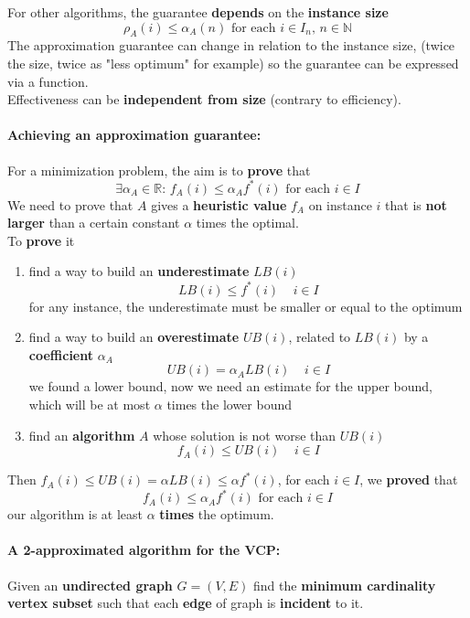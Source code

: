 \documentclass[11pt]{article}
\begin{document}
	For other algorithms, the guarantee \textbf{depends} on the \textbf{instance size}
	$$ \rho_A (i) \leq \alpha_A (n) \text{ for each } i \in I_n, \, n \in \mathbb{N} $$
	The approximation guarantee can change in relation to the instance size, (twice the size, twice as "less optimum" for example) so the guarantee can be expressed via a function.\\
	
	Effectiveness can be \textbf{independent from size} (contrary to efficiency).\\
	
	\newpage
	
	\paragraph{Achieving an approximation guarantee:} For a minimization problem, the aim is to \textbf{prove} that
	$$ \exists \alpha_A \in \mathbb{R} : \, f_A (i) \leq \alpha_A f^\ast (i) \text{ for each } i \in I $$
	We need to prove that $A$ gives a \textbf{heuristic value} $f_A$ on instance $i$ that is \textbf{not larger} than a certain constant $\alpha$ times the optimal.\\
	
	To \textbf{prove} it
	\begin{enumerate}
		\item find a way to build an \textbf{underestimate} $LB(i)$
		$$ LB(i) \leq f^\ast (i) \;\;\;\; i \in I $$
		for any instance, the underestimate must be smaller or equal to the optimum
		\item find a way to build an \textbf{overestimate} $UB(i)$, related to $LB(i)$ by a \textbf{coefficient} $\alpha_A$
		$$ UB(i) = \alpha_A LB(i) \;\;\;\; i \in I $$
		we found a lower bound, now we need an estimate for the upper bound, which will be at most $\alpha$ times the lower bound
		\item find an \textbf{algorithm} $A$ whose solution is not worse than $UB(i)$
		$$ f_A (i) \leq UB(i) \;\;\;\; i \in I $$
	\end{enumerate}
	Then $f_A (i) \leq UB(i) = \alpha LB(i) \leq \alpha f^\ast (i)$, for each $i \in I$, we \textbf{proved} that
	$$ f_A (i) \leq \alpha_A f^\ast (i) \text{ for each } i \in I $$
	our algorithm is at least $\alpha$ \textbf{times} the optimum.\\
	
	\newpage
	
	\paragraph{A 2-approximated algorithm for the VCP:} Given an \textbf{undirected graph} $G = (V , E )$ find the \textbf{minimum cardinality vertex subset} such that each \textbf{edge} of graph is \textbf{incident} to it.\\
	
\end{document}
